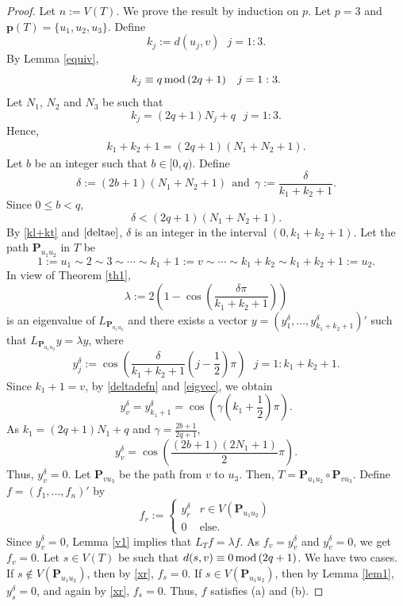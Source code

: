 \documentclass[preprint,12pt]{elsarticle}
\newcommand{\1}{\mathbf{1}}
\newcommand{\0}{\mathbf{0}}
\newcommand{\p}{{\mathbf{P}}}
\def\pt{\mathbf{p}}
\def\p{\mathbf{P}}
\begin{document}
\begin{proof}
 Let $n:=V(T)$. We prove the result by induction on $p$. Let $p=3$
and $\pt(T)=\{u_1,u_2,u_3\}$.
Define
$$k_j:=d(u_j,v)~~~j=1:3.$$
By Lemma \ref{equiv},
\[k_j\equiv q\,{\rm{mod}}\,(2q+1)~~~j=1:3.\]
Let $N_1$, $N_2$ and $N_3$ be such that
\[k_j=(2q+1)N_j+q~~~j=1:3.\]
Hence,
\begin{align} \label{kl+kt}
k_1+k_2+1=(2q+1)(N_1+N_2+1).
\end{align}
Let $b$ be an integer such that $b \in [0,q)$. Define
\begin{equation} \label{deltadefn}
\delta:=(2b+1)(N_1+N_2+1)~~\text{and}~~\gamma:=\frac{\delta}{k_1+k_2+1}. 
\end{equation}
Since $0 \leq b < q$,
\begin{equation} \label{deltae}
\delta < (2q+1) (N_1+N_2+1).
\end{equation}
By \eqref{kl+kt} and $\eqref{deltae}$,
$\delta$ is an integer in  the interval $(0,k_1 + k_2 +1)$.
Let the path $\p_{u_1u_2}$ in $T$ be
\[1:=u_1 \sim 2 \sim 3 \sim \cdots \sim k_1+1:=v \sim \cdots \sim k_1+k_2 \sim k_{1}+k_{2}+1:=u_2.\]
In view of Theorem \ref{th1}, 
\[\lambda:=2\left(1- \cos\left(\frac{{\delta \pi}}{{k_1+k_2+1}}\right)\right)\]
is an eigenvalue of $L_{\p_{u_1u_2}}$ and
there exists a vector $y=(y_1^{\delta},\dotsc,y_{k_1+k_2+1}^{\delta})'$ such that
$L_{\p_{u_1u_2}}y=\lambda y$, where 
\begin{equation}\label{eigvec}
 y_j^{\delta}:=\cos\left(\frac{\delta}{k_1+k_2+1} \left(j-\frac{1}{2} \right)\pi \right)~~~j=1:k_1+k_2+1.   
\end{equation}
 Since $k_1+1=v$, by \eqref{deltadefn} and \eqref{eigvec}, we obtain 
\[y_v^{\delta}=y_{k_1+1}^{\delta}=
        \cos \left(\gamma\left( k_1+\frac{1}{2} \right)\pi  \right).\]
As $k_1=(2q+1)N_1+q$ and $\gamma=\frac{2b+1}{2q+1}$,
       \[y_v^{\delta}= \cos \left( \frac{(2b+1)(2N_1+1)}{2}\pi \right).\]
        Thus,  $y_v^{\delta}=0$. Let $\p_{vu_3}$ be the path from $v$ to $u_3$.
        Then,
        $T=\p_{u_1u_2} \circ \p_{v u_3}$.
Define $f=(f_1,\dotsc,f_n)'$ by
\begin{equation}\label{xr}
f_r:=
\begin{cases}
y_r^{\delta} & r\in V(\p_{u_1u_2}) \\
0 & \mbox{else.}
\end{cases}    
\end{equation}
Since $y_v^\delta=0$, Lemma \ref{v1} implies that
$L_Tf=\lambda f$.
As $f_v=y_v^{\delta}$ and $y_v^{\delta}=0$, we get $f_v=0$.
Let $s \in V(T)$ be  such that $d(s,v) \equiv 0\,{\rm{mod}}\,(2q+1)$. 
We have two cases.
If $s\notin V(\p_{u_1u_2})$, then
by \eqref{xr}, $f_s=0$. If $s\in V(\p_{u_1u_2})$, then by Lemma \ref{lem1}, 
$y_s^{\delta}=0$, and again by
\eqref{xr},
\(f_s=0.\)
Thus, $f$ satisfies (a) and (b).



\end{proof}
\end{document}
